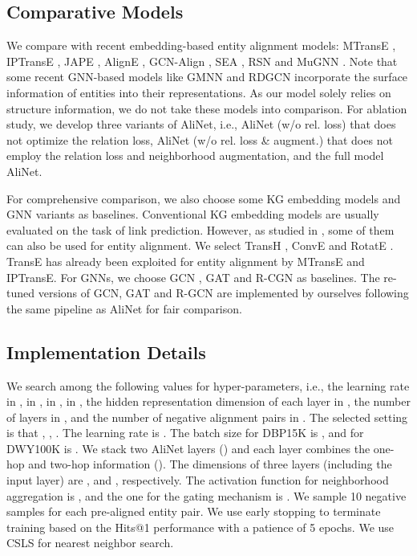 \documentclass[letterpaper]{article} \usepackage{aaai20}  \usepackage{times}  \usepackage{helvet} \usepackage{courier}  \usepackage[hyphens]{url}  \usepackage{graphicx} \urlstyle{rm} \def\UrlFont{\rm}  \frenchspacing  \setlength{\pdfpagewidth}{8.5in}  \setlength{\pdfpageheight}{11in}  \usepackage{amsmath}
\begin{document}
\subsection{Comparative Models}
We compare with recent embedding-based entity alignment models: MTransE \cite{MTransE}, IPTransE \cite{IPTransE}, JAPE \cite{JAPE}, AlignE \cite{BootEA}, GCN-Align \cite{GCN_Align}, SEA \cite{SEA}, RSN \cite{RSN} and MuGNN \cite{MuGNN}. Note that some recent GNN-based models like GMNN \cite{KGMatching} and RDGCN \cite{RDGCN} incorporate the surface information of entities into their representations. As our model solely relies on structure information, we do not take these models into comparison. For ablation study, we develop three variants of AliNet, i.e., AliNet (w/o rel. loss) that does not optimize the relation loss, AliNet (w/o rel. loss \& augment.) that does not employ the relation loss and neighborhood augmentation, and the full model AliNet.

For comprehensive comparison, we also choose some KG embedding models and GNN variants as baselines. Conventional KG embedding models are usually evaluated on the task of link prediction. However, as studied in \cite{MultiKE}, some of them can also be used for entity alignment. We select TransH \cite{TransH}, ConvE \cite{ConvE} and RotatE \cite{RotatE}. TransE \cite{TransE} has already been exploited for entity alignment by MTransE and IPTransE. For GNNs, we choose GCN \cite{GCN}, GAT \cite{GAT} and R-CGN \cite{R-GCN} as baselines. The re-tuned versions of GCN, GAT and R-GCN are implemented by ourselves following the same pipeline as AliNet for fair comparison. 

\subsection{Implementation Details}
We search among the following values for hyper-parameters, i.e., the learning rate in ,  in ,  in ,  in , the hidden representation dimension of each layer in , the number of layers  in , and the number of negative alignment pairs in . The selected setting is that , , . The learning rate is . The batch size for DBP15K is , and for DWY100K is . We stack two AliNet layers () and each layer combines the one-hop and two-hop information (). The dimensions of three layers (including the input layer) are ,  and , respectively. The activation function for neighborhood aggregation is , and the one for the gating mechanism is . We sample 10 negative samples for each pre-aligned entity pair. We use early stopping to terminate training based on the Hits@1 performance with a patience of 5 epochs. We use CSLS \cite{Word_Translation} for nearest neighbor search.
\end{document}
